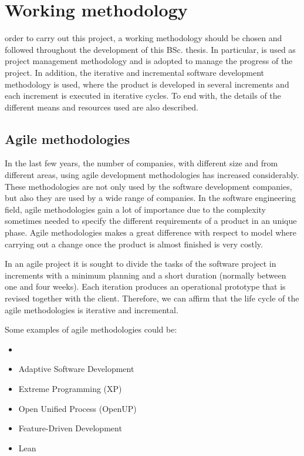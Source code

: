 
\chapter{Working methodology}
\label{chap:methodology}

 order to carry out this project, a working methodology should be chosen and followed throughout the development of this \ac{BSc.} thesis. In particular,  is used as project management methodology and  is adopted to manage the progress of the project. In addition, the iterative and incremental software development methodology is used, where the product is developed in several increments and each increment is executed in iterative cycles. To end with, the details of the different means and resources used are also described.


\section{Agile methodologies}

In the last few years, the number of companies, with different size and from different areas, using agile development methodologies has increased considerably. These methodologies are not only used by the software development companies, but also they are used by a wide range of companies. In the software engineering field, agile methodologies gain a lot of importance due to the complexity sometimes needed to specify the different requirements of a product in an unique phase. Agile methodologies makes a great difference with respect to  model where carrying out a change once the product is almost finished is very costly.

In an agile project it is sought to divide the tasks of the software project in increments with a minimum planning and a short duration (normally between one and four weeks). Each iteration produces an operational prototype that is revised together with the client. Therefore, we can affirm that the life cycle of the agile methodologies is iterative and incremental.

Some examples of agile methodologies could be:
\begin{multicols}{2}
	\begin{itemize}
		\item {} \cite{ScrumGuide}
		\item Adaptive Software Development \\ \cite{ASD}
		\item Extreme Programming (XP) \cite{XPProgramming}
		\item Open Unified Process (OpenUP) \\ \cite{Bal07}
		\item Feature-Driven Development \cite{FDD}
		\item Lean \cite{PP03}
	\end{itemize}
\end{multicols}

